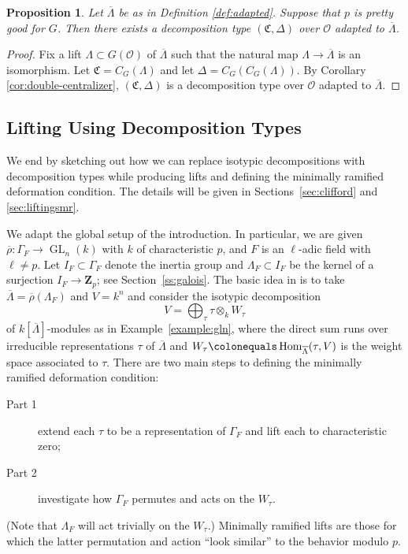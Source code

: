 \documentclass[11pt, letterpaper,english]{amsart}
\theoremstyle{plain}
\newtheorem{prop}[lem]{Proposition}
\theoremstyle{definition}
\numberwithin{equation}{section}
\numberwithin{lem}{section}
\newcommand{\mathfont}{\mathbf}
\newcommand{\Z}{\mathfont Z}
\newcommand{\fC}{\mathfrak{C}}
\newcommand{\cO}{\mathcal{O}}
\DeclareMathOperator{\Hom}{Hom}
\newcommand \tensor[1] {\otimes_{#1}}
\newcommand{\rhobar}{{\overline{\rho}}}
\DeclareMathOperator{\GL}{GL}
\newcommand{\cent}[2]{C_{#1}(#2)}
\newcommand{\Ld}{\Lambda}
\newcommand{\Lbar}{\overline{\Lambda}}
\newcommand{\Dt}{\Delta}
\begin{document}
\begin{prop} \label{prop:existence of decomp type}
Let $\Lbar$ be as in Definition \ref{def:adapted}.
Suppose that $p$ is pretty good for $G$. Then there exists a decomposition type $(\fC,\Delta)$ over $\cO$ adapted to $\Lbar$. 
\end{prop}

\begin{proof}
Fix a lift $\Ld \subset G(\cO)$ of $\Lbar$ such that the natural map $\Ld \to \Lbar$ is an isomorphism. 
Let $\fC=\cent{G}{\Ld}$ and let $\Dt=\cent{G}{\cent{G}{\Ld}}$. By Corollary \ref{cor:double-centralizer}, $(\fC,\Delta)$ is a decomposition type over $\cO$ adapted to $\Lbar$. 
\end{proof}

\iffalse
\subsection{Lifting Using Decomposition Types}  \label{ss:overview} 
We end by sketching out how we can replace isotypic decompositions with decomposition types while producing lifts and defining the minimally ramified deformation condition.  The details will be given in Sections~\ref{sec:clifford} and \ref{sec:liftingsmr}.

We adapt the global setup of the introduction.  In particular, we are given $\rhobar: \Gamma_F \to \GL_n(k)$ with $k$ of characteristic $p$, and $F$ is an $\ell$-adic field with $\ell \neq p$.  
Let $I_F \subset \Gamma_F$ denote the inertia group and $\Lambda_F \subset I_F$ be the kernel of a surjection $I_F \to \Z_p$; see Section~\ref{ss:galois}.
The basic idea in \cite{cht08} is to  take $\Lbar = \rhobar(\Lambda_F)$ and $V = k^n$ and consider the isotypic decomposition
\begin{equation} \label{eq:isotypic}
V = \bigoplus_{\tau} \tau \tensor{k} W_\tau
\end{equation}
of $k[\Lbar]$-modules as in Example~\ref{example:gln},
where the direct sum runs over irreducible representations $\tau$ of $\Lbar$ and $W_\tau \colonequals \Hom_{\Lbar}(\tau,V)$ is the weight space associated to $\tau$.  There are two main steps to defining the minimally ramified deformation condition:
\begin{description}
    \item[Part 1] extend each $\tau$ to be a representation of $\Gamma_F$ and lift each to characteristic zero; 
    \item[Part 2] investigate how $\Gamma_F$ permutes and acts on the $W_\tau$.
\end{description}
(Note that $\Lambda_F$ will act trivially on the $W_\tau$.)
Minimally ramified lifts are those for which the latter permutation and action ``look similar'' to the behavior modulo $p$. 
\end{document}
